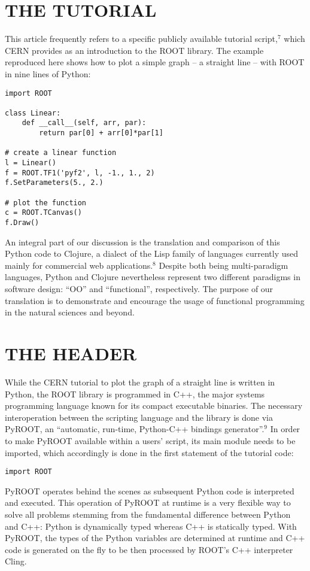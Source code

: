 \documentclass{IEEEcsmag}
\begin{document}
\section{THE TUTORIAL}
This article frequently refers to a specific publicly available tutorial script,$^{7}$ which CERN provides as an introduction to the ROOT library. The example reproduced here shows how to plot a simple graph – a straight line – with ROOT in nine lines of Python:
{\color{magenta}\begin{verbatim}
import ROOT

class Linear:
    def __call__(self, arr, par):
        return par[0] + arr[0]*par[1]

# create a linear function
l = Linear()
f = ROOT.TF1('pyf2', l, -1., 1., 2)
f.SetParameters(5., 2.)

# plot the function
c = ROOT.TCanvas()
f.Draw()
\end{verbatim}}
An integral part of our discussion is the translation and comparison of this Python code to Clojure, a dialect of the Lisp family of languages currently used mainly for commercial web applications.$^{8}$ Despite both being multi-paradigm languages, Python and Clojure nevertheless represent two different paradigms in software design: “OO” and “functional”, respectively. The purpose of our translation is to demonstrate and encourage the usage of functional programming in the natural sciences and beyond.\vspace*{-5pt}

\section{THE HEADER}
While the CERN tutorial to plot the graph of a straight line is written in Python, the ROOT library is programmed in C++, the major systems programming language known for its compact executable binaries. The necessary interoperation between the scripting language and the library is done via PyROOT, an “automatic, run-time, Python-C++ bindings generator”.$^{9}$ In order to make PyROOT available within a users’ script, its main module needs to be imported, which accordingly is done in the first statement of the tutorial code:
{\color{magenta}\begin{verbatim}
import ROOT
\end{verbatim}}
PyROOT operates behind the scenes as subsequent Python code is interpreted and executed. This operation of PyROOT at runtime is a very flexible way to solve all problems stemming from the fundamental difference between Python and C++: Python is dynamically typed whereas C++ is statically typed. With PyROOT, the types of the Python variables are determined at runtime and C++ code is generated on the fly to be then processed by ROOT’s C++ interpreter Cling.\vspace*{-5pt}
\end{document}
